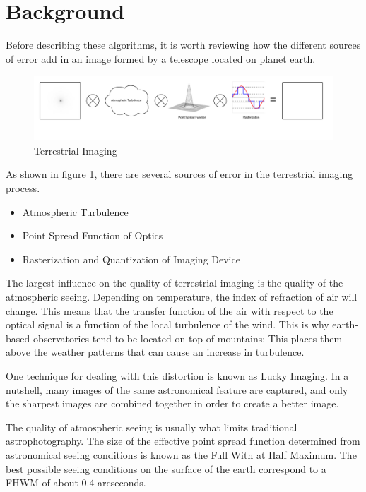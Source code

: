 \documentclass[conference]{IEEEtran}
\newcommand{\centerimage}[3]{
\begin{figure}[!h]  
\centering
#1
\caption{#2}
\label{#3}
\end{figure}}
\begin{document}
\section{Background}

Before describing these algorithms, it is worth reviewing how the
different sources of error add in an image formed by a telescope
located on planet earth.

\centerimage{\includegraphics[width=0.9\columnwidth]{img/terrestrial_imaging.png}}{Terrestrial Imaging}{fig:imaging}

As shown in figure \ref{fig:imaging}, there are several sources of
error in the terrestrial imaging process.

\begin{itemize}
  \item Atmospheric Turbulence \\ 
  \item Point Spread Function of Optics \\
  \item Rasterization and Quantization of Imaging Device
\end{itemize}

The largest influence on the quality of terrestrial imaging is the
quality of the atmospheric seeing. Depending on temperature, the index
of refraction of air will change. This means that the transfer
function of the air with respect to the optical signal is a function
of the local turbulence of the wind. This is why earth-based
observatories tend to be located on top of mountains: This places them
above the weather patterns that can cause an increase in
turbulence.

One technique for dealing with this distortion is known as Lucky
Imaging\cite{law2007lucky}. In a nutshell, many images of the same
astronomical feature are captured, and only the sharpest images are
combined together in order to create a better image.

The quality of atmospheric seeing is usually what limits traditional
astrophotography. The size of the effective point spread function
determined from astronomical seeing conditions is known as the Full
With at Half Maximum\cite{FWHM}. The best possible seeing conditions
on the surface of the earth correspond to a FHWM of about 0.4
arcseconds.
\end{document}
